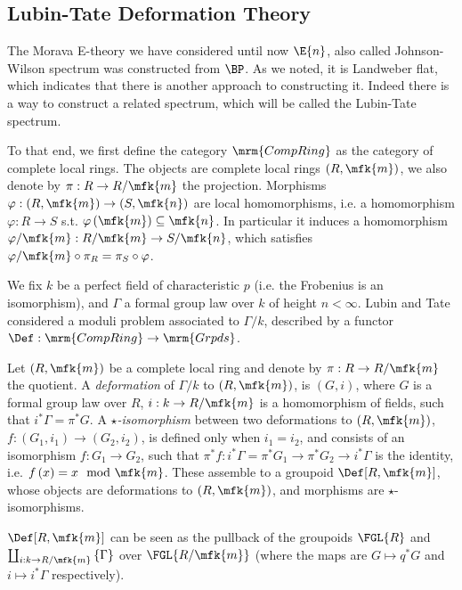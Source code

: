 \subsection{Lubin-Tate Deformation Theory}

The Morava E-theory we have considered until now $\E{n}$, also called Johnson-Wilson spectrum was constructed from $\BP$.
As we noted, it is Landweber flat, which indicates that there is another approach to constructing it.
Indeed there is a way to construct a related spectrum, which will be called the Lubin-Tate spectrum.

To that end, we first define the category $\mrm{CompRing}$ as the category of complete local rings.
The objects are complete local rings $\left(R, \mfk{m}\right)$, we also denote by $\pi: R \to R/\mfk{m}$ the projection.
Morphisms $\varphi: \left(R, \mfk{m}\right) \to \left(S, \mfk{n}\right)$ are local homomorphisms, i.e. a homomorphism $\varphi: R \to S$ s.t. $\varphi\left(\mfk{m}\right) \subseteq \mfk{n}$.
In particular it induces a homomorphism $\varphi/\mfk{m}: R/\mfk{m} \to S/\mfk{n}$, which satisfies $\varphi/\mfk{m} \circ \pi_R = \pi_S \circ \varphi$.

We fix $k$ be a perfect field of characteristic $p$ (i.e. the Frobenius is an isomorphism), and $\Gamma$ a formal group law over $k$ of height $n < \infty$.
Lubin and Tate \cite{LT} considered a moduli problem associated to $\Gamma/k$, described by a functor $\Def: \mrm{CompRing} \to \mrm{Grpds}$.

\begin{definition}
	Let $\left(R, \mfk{m}\right)$ be a complete local ring and denote by $\pi: R \to R/\mfk{m}$ the quotient.
	A \emph{deformation} of $\Gamma/k$ to $\left(R, \mfk{m}\right)$, is $\left(G, i\right)$, where $G$ is a formal group law over $R$, $i: k \to R/\mfk{m}$ is a homomorphism of fields, such that $i^* \Gamma = \pi^* G$.
	A \emph{$\star$-isomorphism} between two deformations to $\left(R, \mfk{m}\right)$, $f: \left(G_1, i_1\right) \to \left(G_2, i_2\right)$, is defined only when $i_1 = i_2$, and consists of an isomorphism $f: G_1 \to G_2$, such that $\pi^* f: i^*\Gamma = \pi^* G_1 \to \pi^* G_2 \to i^*\Gamma$ is the identity, i.e. $f\left(x\right) = x \mod \mfk{m}$.
	These assemble to a groupoid $\Def[R, \mfk{m}]$, whose objects are deformations to $\left(R, \mfk{m}\right)$, and morphisms are $\star$-isomorphisms.
\end{definition}

\begin{remark}
	$\Def[R, \mfk{m}]$ can be seen as the pullback of the groupoids $\FGL{R}$ and $\coprod_{i: k \to R/\mfk{m}} \left\{\Gamma\right\}$ over $\FGL{R/\mfk{m}}$ (where the maps are $G \mapsto q^* G$ and $i \mapsto i^* \Gamma$ respectively).
\end{remark}


